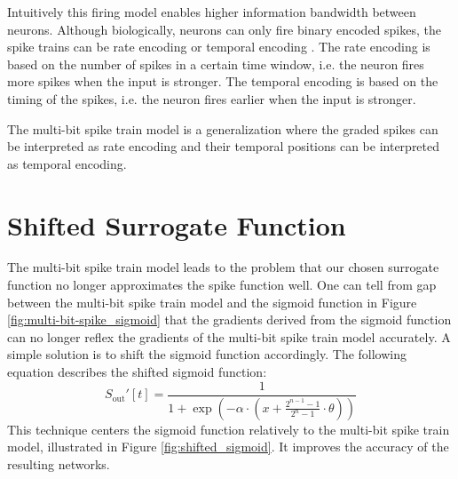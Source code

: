     Intuitively this firing model enables higher information bandwidth between neurons. Although biologically, neurons can only fire binary encoded spikes, the spike trains can be rate encoding \cite{jphysiol.1962.sp006837} or temporal encoding \cite{doi:10.1073/pnas.0610368104}. The rate encoding is based on the number of spikes in a certain time window, i.e. the neuron fires more spikes when the input is stronger. The temporal encoding is based on the timing of the spikes, i.e. the neuron fires earlier when the input is stronger.

    The multi-bit spike train model is a generalization where the graded spikes can be interpreted as rate encoding and their temporal positions can be interpreted as temporal encoding. 

\section{Shifted Surrogate Function}
\label{sec:shifted-surrogate-function}
    The multi-bit spike train model leads to the problem that our chosen surrogate function no longer approximates the spike function well. One can tell from gap between the multi-bit spike train model and the sigmoid function in Figure \ref{fig:multi-bit-spike_sigmoid} that the gradients derived from the sigmoid function can no longer reflex the gradients of the multi-bit spike train model accurately.
    A simple solution is to shift the sigmoid function accordingly. The following equation describes the shifted sigmoid function:
    \begin{equation}
        \label{eq:shifted_sigmoid}
        S_{\text{out}}'[t] = \frac{1}{1 + \exp(-\alpha \cdot (x + \frac{2^{n-1}-1}{2^n-1}\cdot\theta))}
    \end{equation}
    This technique centers the sigmoid function relatively to the multi-bit spike train model, illustrated in Figure \ref{fig:shifted_sigmoid}. It improves the accuracy of the resulting networks. 
